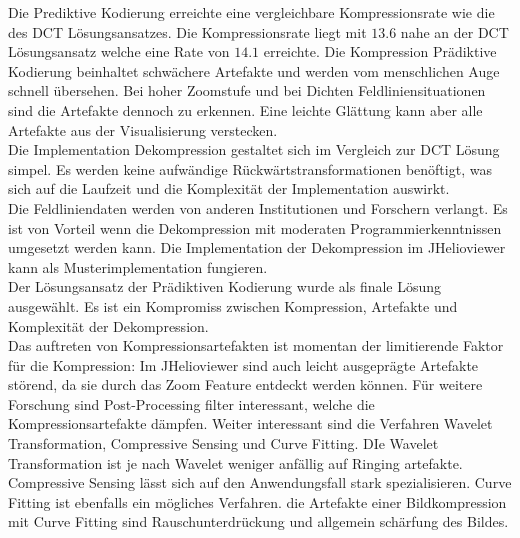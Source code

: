 Die Prediktive Kodierung erreichte eine vergleichbare Kompressionsrate wie die des DCT Lösungsansatzes. Die Kompressionsrate liegt mit $13.6$ nahe an der DCT Lösungsansatz welche eine Rate von $14.1$ erreichte. Die Kompression Prädiktive Kodierung beinhaltet schwächere Artefakte und werden vom menschlichen Auge schnell übersehen. Bei hoher Zoomstufe und bei Dichten Feldliniensituationen sind die Artefakte dennoch zu erkennen. Eine leichte Glättung kann aber alle Artefakte aus der Visualisierung verstecken.\\
Die Implementation Dekompression gestaltet sich im Vergleich zur DCT Lösung simpel. Es werden keine aufwändige Rückwärtstransformationen benöftigt, was sich auf die Laufzeit und die Komplexität der Implementation auswirkt.\\
Die Feldliniendaten werden von anderen Institutionen und Forschern verlangt. Es ist von Vorteil wenn die Dekompression mit moderaten Programmierkenntnissen umgesetzt werden kann. Die Implementation der Dekompression im JHelioviewer kann als Musterimplementation fungieren.\\
Der Lösungsansatz der Prädiktiven Kodierung wurde als finale Lösung ausgewählt. Es ist ein Kompromiss zwischen Kompression, Artefakte und Komplexität der Dekompression.\\

Das auftreten von Kompressionsartefakten ist momentan der limitierende Faktor für die Kompression: Im JHelioviewer sind auch leicht ausgeprägte Artefakte störend, da sie durch das Zoom Feature entdeckt werden können. Für weitere Forschung sind Post-Processing filter interessant, welche die Kompressionsartefakte dämpfen. Weiter interessant sind die Verfahren Wavelet Transformation, Compressive Sensing und Curve Fitting. DIe Wavelet Transformation ist je nach Wavelet weniger anfällig auf Ringing artefakte. Compressive Sensing lässt sich auf den Anwendungsfall stark spezialisieren. Curve Fitting ist ebenfalls ein mögliches Verfahren. die Artefakte einer Bildkompression mit Curve Fitting sind Rauschunterdrückung und allgemein schärfung des Bildes. 